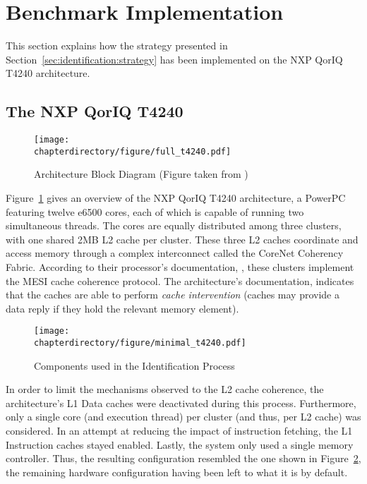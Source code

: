 \stopallthesefloats
\section{Benchmark Implementation}
\label{sec:identification:implementation}
This section explains how the strategy presented in
Section~\ref{sec:identification:strategy} has been implemented on the NXP QorIQ
T4240 architecture.

\subsection{The NXP QorIQ T4240}
\begin{figure}[hbt!]
\begin{center}
\texttt{[image: \\chapterdirectory/figure/full\_t4240.pdf]}
\end{center}
\caption{Architecture Block Diagram (Figure taken from \cite{T4240})}%
\label{fig:full_t4240}
\end{figure}

Figure~\ref{fig:full_t4240} gives an overview of the NXP QorIQ T4240
architecture, a PowerPC featuring twelve e6500 cores, each of which is capable
of running two simultaneous threads. The cores are equally distributed among
three clusters, with one shared 2MB L2 cache per cluster. These three L2 caches
coordinate and access memory through a complex interconnect called the CoreNet
Coherency Fabric. According to their processor's documentation, \cite{e6500},
these clusters implement the MESI cache coherence protocol. The architecture's
documentation, \cite{T4240} indicates that the caches are able to perform
\textit{cache intervention} (caches may provide a data reply if they hold the
relevant memory element).

\begin{figure}[hbt!]
\begin{center}
\texttt{[image: \\chapterdirectory/figure/minimal\_t4240.pdf]}
\end{center}
\caption{Components used in the Identification Process}
\label{fig:t4240_experimental_setup}
\end{figure}

In order to limit the mechanisms observed to the L2 cache coherence, the
architecture's L1 Data caches were deactivated during this process. Furthermore,
only a single core (and execution thread) per cluster (and thus, per L2 cache)
was considered. In an attempt at reducing the impact of instruction fetching,
the L1 Instruction caches stayed enabled. Lastly, the system only used a single
memory controller. Thus, the resulting configuration resembled the one shown in
Figure~\ref{fig:t4240_experimental_setup}, the remaining hardware configuration
having been left to what it is by default.

